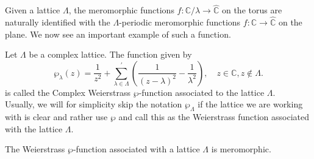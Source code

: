  Given a lattice $\Lambda$, the meromorphic functions $f: \mathbb{C} / \lambda \longrightarrow \widehat{\mathbb{C}}$ on the torus are naturally identified with the $\Lambda$-periodic meromorphic functions $f: \mathbb{C} \longrightarrow \widehat{\mathbb{C}}$ on the plane. We now see an important example of such a function.

\begin{definition}
Let $\Lambda$ be a complex lattice. The function given by 
$$
\wp_\lambda(z)=\frac{1}{z^{2}}+\sum_{\lambda \in \Lambda}^{\prime}\left(\frac{1}{(z-\lambda)^{2}}-\frac{1}{\lambda^{2}}\right), \quad z \in \mathbb{C}, z \notin \Lambda .
$$
is called the Complex Weierstrass $\wp$-function associated to the lattice $\Lambda$. \\
Usually, we will for simplicity skip the notation $\wp_\Lambda$ if the lattice we are working with is clear and rather use $\wp$ and call this as the Weierstrass function associated with the lattice $\Lambda$.  
    
\end{definition}

\begin{proposition}
    The Weierstrass $\wp$-function associated with a lattice $\Lambda$ is meromorphic.
\end{proposition}

